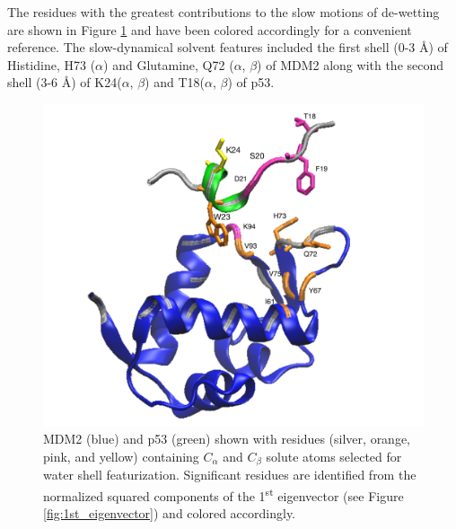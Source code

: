 The residues with the greatest contributions to the slow motions of de-wetting are shown in Figure \ref{fig:atom_indices} and have been colored accordingly for a convenient reference.  The slow-dynamical solvent features included the first shell (0-3 Å) of Histidine, H73 ($\alpha$) and Glutamine, Q72 ($\alpha$, $\beta$) of MDM2 along with the second shell (3-6 Å) of K24($\alpha$, $\beta$) and T18($\alpha$, $\beta$) of p53.



\begin{figure}[h!]
\centering
\includegraphics[scale=0.5]{Figures/Structure/Atom_indices_with_1st_eigenvector_sel.pdf}
\caption{MDM2 (blue) and p53 (green) shown with residues (silver, orange, pink, and yellow) containing $C_{\alpha}$ and $C_{\beta}$ solute atoms selected for water shell featurization. Significant residues are identified from the normalized squared components of the 1\textsuperscript{st} eigenvector (see Figure \ref{fig:1st_eigenvector}) and colored accordingly.}
\label{fig:atom_indices}
\end{figure}


